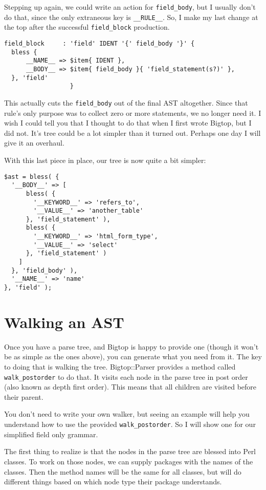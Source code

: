 Stepping up again, we could write an action for \verb+field_body+, but
I usually don't do that, since the only extraneous key is \verb+__RULE__+.
So, I make my last change at the top after the successful \verb+field_block+
production.

\begin{verbatim}
field_block     : 'field' IDENT '{' field_body '}' {
  bless {
      __NAME__ => $item{ IDENT },
      __BODY__ => $item{ field_body }{ 'field_statement(s?)' },
  }, 'field'
                  }
\end{verbatim}

This actually cuts the \verb+field_body+ out of the final AST altogether.
Since that rule's only purpose was to collect zero or more statements,
we no longer need it.  I wish I could tell you that I thought to do that
when I first wrote Bigtop, but I did not.  It's tree could be a lot
simpler than it turned out.  Perhaps one day I will give it an overhaul.

With this last piece in place, our tree is now quite a bit simpler:

\begin{verbatim}
$ast = bless( {
  '__BODY__' => [
      bless( {
        '__KEYWORD__' => 'refers_to',
        '__VALUE__' => 'another_table'
      }, 'field_statement' ),
      bless( {
        '__KEYWORD__' => 'html_form_type',
        '__VALUE__' => 'select'
      }, 'field_statement' )
    ]
  }, 'field_body' ),
  '__NAME__' => 'name'
}, 'field' );
\end{verbatim}

\section{Walking an AST}

Once you have a parse tree, and Bigtop is happy to provide one (though it
won't be as simple as the ones above), you can generate what you need from
it.  The key to doing that is walking the tree.  Bigtop::Parser provides
a method called \verb+walk_postorder+ to do that.  It visits each node in
the parse tree in post order (also known as depth first order).
This means that all children are visited before their parent.

You don't need to write your own walker, but seeing an example will help you
understand how to use the provided \verb+walk_postorder+.  So I will
show one for our simplified field only grammar.

The first thing to realize is that the nodes in the parse tree are
blessed into Perl classes.  To work on those nodes, we can supply packages
with the names of the classes.  Then the method names will be the same for
all classes, but will do different things based on which node type their
package understands.

